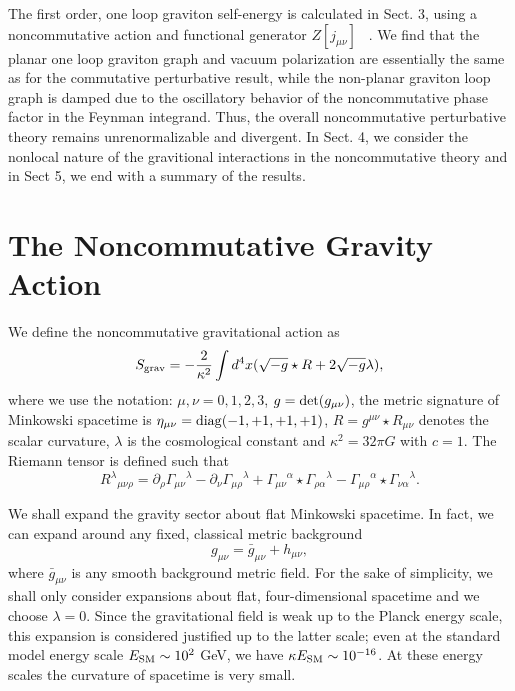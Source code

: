\documentclass[a4paper,10pt]{article}
\begin{document}
The first order, one loop graviton self-energy is calculated in Sect.
3, using a noncommutative action and functional generator $Z[j_{\mu\nu}]$
~\cite{Feynman,Goldberg,Fradkin,Veltman,Leibbrandt,Brown,Medrano,Duff,Duff2,Donoghue}.
We find that the planar one loop graviton graph and vacuum polarization are
essentially the same as for the commutative perturbative result, while the non-planar
graviton loop graph is damped due to the oscillatory behavior of the noncommutative
phase factor in the Feynman integrand. Thus, the overall noncommutative perturbative
theory remains unrenormalizable and divergent. In Sect. 4, we consider the nonlocal
nature of the gravitional interactions in the noncommutative theory and in Sect 5, we
end with a summary of the results.

\section{\bf The Noncommutative Gravity Action}

We define the noncommutative gravitational action as
\begin{equation}
S_{\rm grav}=-\frac{2}{\kappa^2}\int d^4x(\sqrt{-g}\star R+2\sqrt{-g}\lambda),
\end{equation}
where we use the notation: $\mu,\nu=0,1,2,3$, $g={\rm det}(g_{\mu\nu})$, the
metric signature of Minkowski spacetime is $\eta_{\mu\nu}={\rm
diag}(-1,+1,+1,+1)$, $R=g^{\mu\nu}\star R_{\mu\nu}$ denotes the scalar curvature,
$\lambda$ is the cosmological constant and $\kappa^2=32\pi G$ with $c=1$. The Riemann
tensor is defined such that
\begin{equation}
{R^\lambda}_{\mu\nu\rho}=\partial_\rho{\Gamma_{\mu\nu}}^\lambda
-\partial_\nu{\Gamma_{\mu\rho}}^\lambda+
{\Gamma_{\mu\nu}}^\alpha\star{\Gamma_{\rho\alpha}}^\lambda
-{\Gamma_{\mu\rho}}^\alpha\star{\Gamma_{\nu\alpha}}^\lambda.
\end{equation}

We shall expand the gravity sector about flat Minkowski spacetime. In fact, we can
expand around any fixed, classical metric background~\cite{Veltman}
\begin{equation}
\label{background}
g_{\mu\nu}={\bar g}_{\mu\nu}+h_{\mu\nu},
\end{equation}
where ${\bar g}_{\mu\nu}$ is any smooth background metric field. For the sake of
simplicity, we shall only consider expansions about flat,
four-dimensional spacetime and we choose $\lambda=0$. Since the
gravitational field is weak up to the Planck energy scale, this expansion
is considered justified up to the latter scale; even at the standard model
energy scale $E_{\rm SM}\sim 10^2$ GeV, we have $\kappa E_{\rm SM}\sim
10^{-16}$. At these energy scales the curvature of spacetime is very small.
\end{document}
